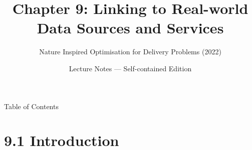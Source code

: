 \documentclass[aspectratio=169,10pt]{beamer}
\title[Ch.9 Real-world Data]{Chapter 9: Linking to Real-world Data Sources and Services}
\subtitle{Nature Inspired Optimisation for Delivery Problems (2022)}
\author{Lecture Notes --- Self-contained Edition}
\date{}
\begin{document}

\begin{frame}
  \titlepage
\end{frame}

\begin{frame}[allowframebreaks]{Table of Contents}
  \tableofcontents
\end{frame}

\section{9.1 Introduction}
\end{document}
